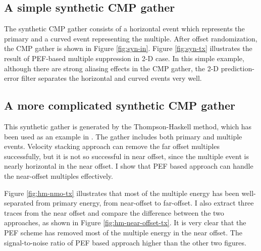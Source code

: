 \subsection{A simple synthetic CMP gather}

The synthetic CMP gather consists of a horizontal event which represents 
the primary and a curved event representing the multiple. After offset 
randomization, the CMP gather is shown in Figure \ref{fig:syn-in}. Figure 
\ref{fig:syn-tx} illustrates the result of PEF-based multiple suppression in 
2-D case. In this simple example, although there are strong aliasing effects 
in the CMP gather, the 2-D prediction-error filter separates the horizontal 
and curved events very well.


\subsection{A more complicated synthetic CMP gather}

This synthetic gather is generated by the Thompson-Haskell method, which 
has been used as an example in \cite{Lumley.sep.82.25}.
The gather includes both primary and multiple events. Velocity stacking 
approach can remove the far offset multiples successfully, but it is not 
so successful in near offset, since the multiple event is nearly horizontal 
in the near offset. I show that PEF based approach can handle the near-offset 
multiples effectively.

Figure \ref{fig:hm-nmo-tx} illustrates that most of the 
multiple energy has been well-separated from primary energy, from near-offset 
to far-offset. I also extract three traces from the near offset and compare 
the difference between the two approaches, as shown in Figure 
\ref{fig:hm-near-offset-tx}. 
It is very clear that the PEF scheme has removed most of the multiple energy 
in the near offset. The signal-to-noise ratio of PEF based approach higher 
than the other two figures.



